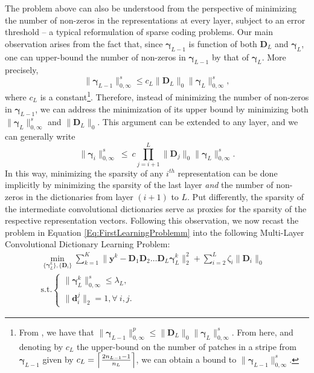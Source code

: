 \documentclass[10pt,journal]{IEEEtran}
\def\d{{\mathbf d}}
\def\y{{\mathbf y}}
\def\D{{\mathbf D}}
\def\gama{{\boldsymbol \gamma}}
\theoremstyle{plain}
\theoremstyle{definition}
\begin{document}
The problem above can also be understood from the perspective of minimizing the number of non-zeros in the representations at every layer, subject to an error threshold -- a typical reformulation of sparse coding problems. Our main observation arises from the fact that, since $\gama_{L-1}$ is function of both $\D_L$ and $\gama_L$, one can upper-bound the number of non-zeros in $\gama_{L-1}$ by that of $\gama_{L}$. More precisely, 
\begin{equation}
\|\gama_{L-1}\|^s_{0,\infty} \leq c_L \|\D_L\|_0\|\gama_{L}\|^s_{0,\infty},	
\end{equation}
where $c_L$ is a constant\footnote{From \cite{Papyan2016convolutional}, we have that $\|\gama_{L-1}\|^p_{0,\infty} \leq \|\D_L\|_0\|\gama_{L}\|^s_{0,\infty}$. From here, and denoting by $c_{L}$ the upper-bound on the number of patches in a stripe from $\gama_{L-1}$ given by $c_L = \Bigl\lceil \frac{2n_{L-1}-1}{n_L} \Bigr\rceil$, we can obtain a bound to $\|\gama_{L-1}\|^s_{0,\infty}$.}.
Therefore, instead of minimizing the number of non-zeros in $\gama_{L-1}$, we can address the minimization of its upper bound by minimizing both $\|\gama_{L}\|^s_{0,\infty}$ and $\|\D_L\|_0$. This argument can be extended to any layer, and we can generally write
 \begin{equation} 
	\|\gama_{i}\|^s_{0,\infty} \ \leq \ c \prod_{j=i+1}^L \|\D_j\|_0  \|\gama_L\|^s_{0,\infty}.
\end{equation}
In this way, minimizing the sparsity of any $i^{th}$ representation can be done implicitly by minimizing the sparsity of the last layer \emph{and} the number of non-zeros in the dictionaries from layer $(i+1)$ to $L$. Put differently, the sparsity of the intermediate convolutional dictionaries serve as proxies for the sparsity of the respective representation vectors. Following this observation, we now recast the problem in Equation \eqref{Eq:FirstLearningProblemm} into the following Multi-Layer Convolutional Dictionary Learning Problem: 
\begin{multline}
	\min_{\{\gama^k_L\},\{\D_i\}} \sum_{k=1}^K \| \y^k - \D_1\D_2\dots\D_L \gama^k_L \|^2_2 + \sum_{i=2}^L \zeta_i \|\D_i\|_0 \quad \\ \text{s.t.} \left\{
	\begin{array}{c}
		\|\gama^k_L\|^s_{0,\infty} \leq \lambda_L, \\
		\|\d^j_i\|_2 = 1, \forall \ i,j.
	\end{array}
\right.		
\label{Eq:SecondLearningProblemm}
\end{multline}
\end{document}
